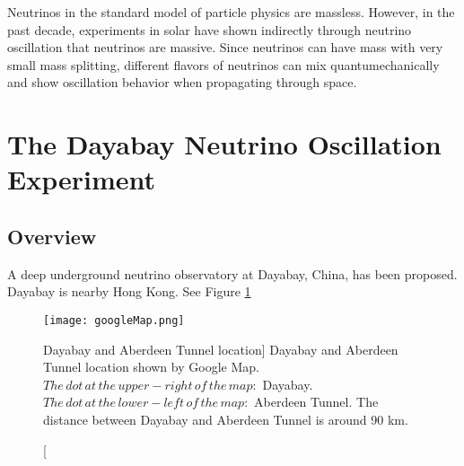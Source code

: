 Neutrinos in the standard model of particle physics are massless.
However, in the past decade, experiments in solar have shown indirectly through neutrino oscillation 
that neutrinos are massive. Since neutrinos can have mass with very small mass splitting, different flavors of neutrinos
can mix quantumechanically and show oscillation behavior when propagating through space.\cite{Perkins:ch1}\cite{Vahle:ch1}\cite{Fkuda:1998} \cite{SNO:2001} 




%
%
%
%
%
%





\section{The Dayabay Neutrino Oscillation Experiment}
\subsection{Overview}

A deep underground neutrino observatory at Dayabay, China, has
been proposed.\cite{DYBProposal:2007} \cite{TDR}
Dayabay is nearby Hong Kong. See Figure \ref{fig:googleMap.png}


\begin{figure}
    \label{fig:googleMap.png}
    \centering
    \texttt{[image: googleMap.png]}
    \caption
    [Dayabay and Aberdeen Tunnel location]
    {Dayabay and Aberdeen Tunnel location shown by Google Map.
$The\,dot\,at\,the\,upper-right\,of\,the\,map:$ Dayabay.
$The\,dot\,at\,the\,lower-left\,of\,the\,map:$ Aberdeen Tunnel.
The distance between Dayabay and Aberdeen Tunnel is around 90 km.}
    \end{figure}



